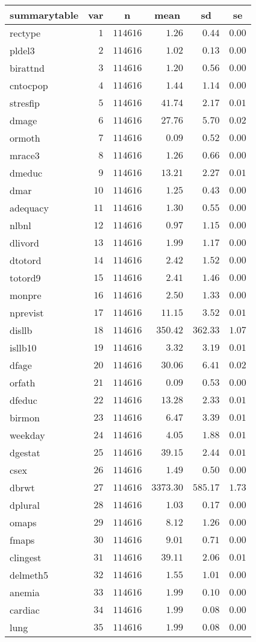 \documentclass[a4paper, 12pt]{article}
\begin{document}
%
\begin{table}[!tbp]
\begin{center}
\begin{tabular}{lrrrrr}
\hline\hline
\multicolumn{1}{l}{summarytable}&\multicolumn{1}{c}{var}&\multicolumn{1}{c}{n}&\multicolumn{1}{c}{mean}&\multicolumn{1}{c}{sd}&\multicolumn{1}{c}{se}\tabularnewline
\hline
rectype&$ 1$&$114616$&$   1.26$&$  0.44$&$0.00$\tabularnewline
pldel3&$ 2$&$114616$&$   1.02$&$  0.13$&$0.00$\tabularnewline
birattnd&$ 3$&$114616$&$   1.20$&$  0.56$&$0.00$\tabularnewline
cntocpop&$ 4$&$114616$&$   1.44$&$  1.14$&$0.00$\tabularnewline
stresfip&$ 5$&$114616$&$  41.74$&$  2.17$&$0.01$\tabularnewline
dmage&$ 6$&$114616$&$  27.76$&$  5.70$&$0.02$\tabularnewline
ormoth&$ 7$&$114616$&$   0.09$&$  0.52$&$0.00$\tabularnewline
mrace3&$ 8$&$114616$&$   1.26$&$  0.66$&$0.00$\tabularnewline
dmeduc&$ 9$&$114616$&$  13.21$&$  2.27$&$0.01$\tabularnewline
dmar&$10$&$114616$&$   1.25$&$  0.43$&$0.00$\tabularnewline
adequacy&$11$&$114616$&$   1.30$&$  0.55$&$0.00$\tabularnewline
nlbnl&$12$&$114616$&$   0.97$&$  1.15$&$0.00$\tabularnewline
dlivord&$13$&$114616$&$   1.99$&$  1.17$&$0.00$\tabularnewline
dtotord&$14$&$114616$&$   2.42$&$  1.52$&$0.00$\tabularnewline
totord9&$15$&$114616$&$   2.41$&$  1.46$&$0.00$\tabularnewline
monpre&$16$&$114616$&$   2.50$&$  1.33$&$0.00$\tabularnewline
nprevist&$17$&$114616$&$  11.15$&$  3.52$&$0.01$\tabularnewline
disllb&$18$&$114616$&$ 350.42$&$362.33$&$1.07$\tabularnewline
isllb10&$19$&$114616$&$   3.32$&$  3.19$&$0.01$\tabularnewline
dfage&$20$&$114616$&$  30.06$&$  6.41$&$0.02$\tabularnewline
orfath&$21$&$114616$&$   0.09$&$  0.53$&$0.00$\tabularnewline
dfeduc&$22$&$114616$&$  13.28$&$  2.33$&$0.01$\tabularnewline
birmon&$23$&$114616$&$   6.47$&$  3.39$&$0.01$\tabularnewline
weekday&$24$&$114616$&$   4.05$&$  1.88$&$0.01$\tabularnewline
dgestat&$25$&$114616$&$  39.15$&$  2.44$&$0.01$\tabularnewline
csex&$26$&$114616$&$   1.49$&$  0.50$&$0.00$\tabularnewline
dbrwt&$27$&$114616$&$3373.30$&$585.17$&$1.73$\tabularnewline
dplural&$28$&$114616$&$   1.03$&$  0.17$&$0.00$\tabularnewline
omaps&$29$&$114616$&$   8.12$&$  1.26$&$0.00$\tabularnewline
fmaps&$30$&$114616$&$   9.01$&$  0.71$&$0.00$\tabularnewline
clingest&$31$&$114616$&$  39.11$&$  2.06$&$0.01$\tabularnewline
delmeth5&$32$&$114616$&$   1.55$&$  1.01$&$0.00$\tabularnewline
anemia&$33$&$114616$&$   1.99$&$  0.10$&$0.00$\tabularnewline
cardiac&$34$&$114616$&$   1.99$&$  0.08$&$0.00$\tabularnewline
lung&$35$&$114616$&$   1.99$&$  0.08$&$0.00$\tabularnewline

\end{tabular}
\end{center}
\end{table}
\end{document}

